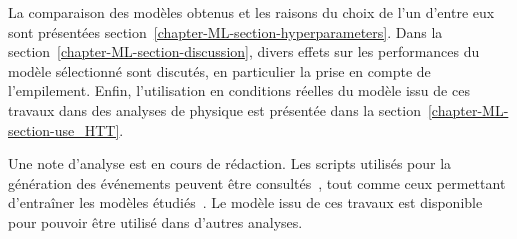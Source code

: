 La comparaison des modèles obtenus et les raisons du choix de l'un d'entre eux sont présentées section~\ref{chapter-ML-section-hyperparameters}.
Dans la section~\ref{chapter-ML-section-discussion},
divers effets sur les performances du modèle sélectionné sont discutés,
en particulier la prise en compte de l'empilement.
Enfin, l'utilisation en conditions réelles du modèle issu de ces travaux dans des analyses de physique est présentée dans la section~\ref{chapter-ML-section-use_HTT}.
\par
Une note d'analyse \cite{CMS-NOTE-2021-054} est en cours de rédaction.
Les scripts utilisés pour la génération des événements peuvent être consultés~\cite{fastsim_ece},
tout comme ceux permettant d'entraîner les modèles étudiés~\cite{DL_for_HTT_mass}.
Le modèle issu de ces travaux est disponible~\cite{DiTau_ML_mass} pour pouvoir être utilisé dans d'autres analyses.
